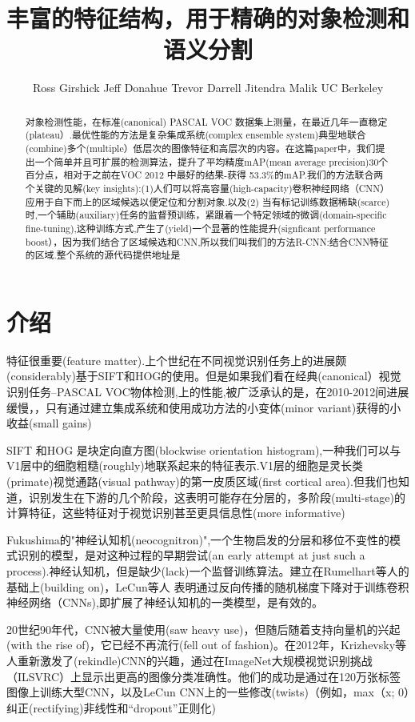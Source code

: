 \documentclass[a4paper,UTF8]{ctexart}
\theoremstyle{definition}
\begin{document}
\title{丰富的特征结构，用于精确的对象检测和语义分割}
\author{Ross Girshick Jeff Donahue Trevor Darrell Jitendra Malik UC Berkeley}
\maketitle
\begin{abstract}
对象检测性能，在标准(canonical) PASCAL VOC 数据集上测量，在最近几年一直稳定(plateau）.最优性能的方法是复杂集成系统(complex ensemble system)典型地联合(combine)多个(multiple）低层次的图像特征和高层次的内容。在这篇paper中，我们提出一个简单并且可扩展的检测算法，提升了平均精度mAP(mean average precision)30个百分点，相对于之前在VOC 2012 中最好的结果-获得 53.3\%的mAP.我们的方法联合两个关键的见解(key insights):(1)人们可以将高容量(high-capacity)卷积神经网络（CNN）应用于自下而上的区域候选以便定位和分割对象.以及(2) 当有标记训练数据稀缺(scarce)时,一个辅助(auxiliary)任务的监督预训练，紧跟着一个特定领域的微调(domain-specific fine-tuning),这种训练方式,产生了(yield)一个显著的性能提升(signficant performance boost），因为我们结合了区域候选和CNN,所以我们叫我们的方法R-CNN:结合CNN特征的区域.整个系统的源代码提供地址是
\end{abstract}

\section{介绍}
特征很重要(feature matter).上个世纪在不同视觉识别任务上的进展颇(considerably)基于SIFT和HOG的使用。但是如果我们看在经典(canonical）视觉识别任务--PASCAL VOC物体检测,上的性能,被广泛承认的是，在2010-2012间进展缓慢，，只有通过建立集成系统和使用成功方法的小变体(minor variant)获得的小收益(small gains)

SIFT 和HOG 是块定向直方图(blockwise orientation histogram),一种我们可以与V1层中的细胞粗糙(roughly)地联系起来的特征表示.V1层的细胞是灵长类(primate)视觉通路(visual pathway)的第一皮质区域(first cortical area).但我们也知道，识别发生在下游的几个阶段，这表明可能存在分层的，多阶段(multi-stage)的计算特征，这些特征对于视觉识别甚至更具信息性(more informative)

Fukushima的"神经认知机(neocognitron)",一个生物启发的分层和移位不变性的模式识别的模型，是对这种过程的早期尝试(an early attempt at just such a process).神经认知机，但是缺少(lack)一个监督训练算法。建立在Rumelhart等人的基础上(building on)，LeCun等人 表明通过反向传播的随机梯度下降对于训练卷积神经网络（CNNs),即扩展了神经认知机的一类模型，是有效的。

20世纪90年代，CNN被大量使用(saw heavy use)，但随后随着支持向量机的兴起(with the rise of)，它已经不再流行(fell out of fashion)。在2012年，Krizhevsky等人重新激发了(rekindle)CNN的兴趣，通过在ImageNet大规模视觉识别挑战（ILSVRC）上显示出更高的图像分类准确性。他们的成功是通过在120万张标签图像上训练大型CNN，以及LeCun CNN上的一些修改(twists)（例如，max（x; 0）纠正(rectifying)非线性和“dropout”正则化)
\end{document}
